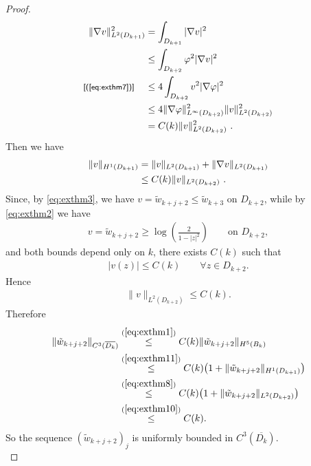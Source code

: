 \documentclass[a4paper,11pt,openright,twoside]{book}
\newcommand{\1}{\mathds{1}}
\newcommand{\commb}[1]{\textsf{{\footnotesize[#1]}}}
\newcommand{\qref}[1]{(\ref{#1})}
\theoremstyle{plain}
\theoremstyle{definition}
\theoremstyle{remark}
\begin{document}
\begin{proof}
	\begin{align*}
		\|\nabla v\|^2_{L^2(D_{k+1})}&=\int_{D_{k+1}} |\nabla v|^2 \\
								  &\leq
		\int_{D_{k+2}} \varphi^2|\nabla v|^2\\
		\commb{\qref{eq:exthm7}}\hspace{4mm}&\leq 4 \int_{D_{k+2}}v^2|\nabla \varphi|^2\\
		&\leq  4\|\nabla \varphi\|^2_{L^\infty(D_{k+2})}\| v\|^2_{L^2(D_{k+2})}\\
		&= C(k) \| v\|^2_{L^2(D_{k+2})} 
	\ . 
	\end{align*}
	Then we have
	\begin{align}\label{eq:exthm8}
		\| v\|_{H^1(D_{k+1})} &= \|v\|_{L^2(D_{k+1})} + \|\nabla v\|_{L^2(D_{k+1})}\notag\\
						   &\leq C(k) \|v\|_{L^2(D_{k+2})}
	\ . 
	\end{align}
	Since, by \eqref{eq:exthm3}, we have $v=\tilde w_{k+j+2}\leq \tilde w_{k+3}$ on $D_{k+2}$, while by \eqref{eq:exthm2} we have
	\begin{align*}
		v=\tilde w_{k+j+2}\geq \log\left( \frac{2}{1-|z|^2}\right)\qquad\text{on }D_{k+2},
	\end{align*}
	and both bounds depend only on $k$, there exists $C(k)$ such that
	\begin{align}\label{eq:exthm9}
		|v(z)|\leq C(k)\qquad \forall z\in D_{k+2}.
	\end{align}
	Hence
	\begin{align}\label{eq:exthm10}
		\|v\|_{L^2(D_{k+2})}\leq C(k).
	\end{align}
	Therefore
	\begin{align*}
		\|\tilde w_{k+j+2}\|_{C^3(\overline{D_k})}
		&\overset{\qref{eq:exthm1}}{\leq} C(k)\|\tilde w_{k+j+2}\|_{H^5(B_k)} \\
		&\overset{\qref{eq:exthm11}}{\leq} C(k)\bigl(1+\|\tilde w_{k+j+2}\|_{H^1(D_{k+1})}\bigr) \\
		&\overset{\qref{eq:exthm8}}{\leq} C(k)\bigl(1+\|\tilde w_{k+j+2}\|_{L^2(D_{k+2})}\bigr) \\
		&\overset{\qref{eq:exthm10}}{\leq} C(k).
	\end{align*}
	So the sequence $(\tilde w_{k+j+2})_j$ is uniformly bounded in $C^3(\overline{D_k})$.\\


\end{proof}
\end{document}
